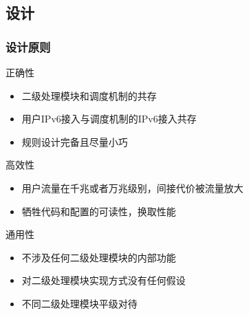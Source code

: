 \documentclass{beamer}
\begin{document}
\subsection{设计}
\begin{frame}
  \frametitle{设计原则}

  \begin{block}{正确性}
    \begin{itemize}
    \item 二级处理模块和调度机制的共存
    \item 用户IPv6接入与调度机制的IPv6接入共存
    \item 规则设计完备且尽量小巧
    \end{itemize}
  \end{block}

  \begin{block}{高效性}
    \begin{itemize}
    \item 用户流量在千兆或者万兆级别，间接代价被流量放大
    \item 牺牲代码和配置的可读性，换取性能
    \end{itemize}
  \end{block}

  \begin{block}{通用性}
    \begin{itemize}
    \item 不涉及任何二级处理模块的内部功能
    \item 对二级处理模块实现方式没有任何假设
    \item 不同二级处理模块平级对待
    \end{itemize}
  \end{block}
\end{frame}
\end{document}
